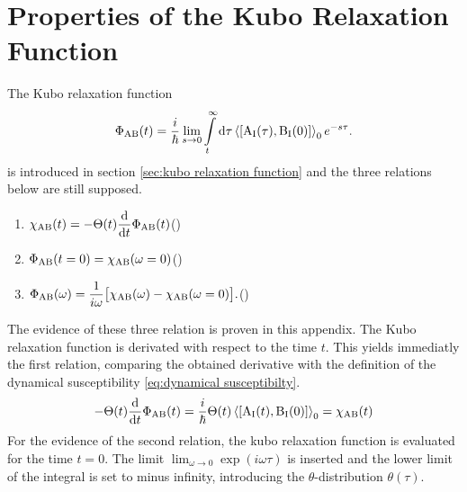 %
%
\chapter{Properties of the Kubo Relaxation Function}
\label{app:properties of the Kubo relaxation function}
%
%
The Kubo relaxation function 
%
\begin{align}
	\Phi_{\mt{AB}}(t) = \frac{i}{\hbar} \lim\limits_{s \to 0} \int\limits_{t}^{\infty} \dd{\tau} \expval{\comm{\mt{A}_{\mt{I}}(\tau)}{\mt{B}_{\mt{I}}(0)}}_{0} e^{-s\tau}.
	\label{appeq:Kubo relaxation function}
\end{align}
%
is introduced in section \ref{sec:kubo relaxation function} and the three relations below are still supposed.
%
\begin{enumerate}
	\item $\begin{aligned}[t] \chi_{\mathrm{AB}}(t) = -\Theta(t) \dv{t} \Phi_{\mathrm{AB}}(t) \end{aligned}$\hfill {}(\theequation)\label{appeq:relation 1 between Phi and chi}
	\item $\begin{aligned}[t] \Phi_{\mathrm{AB}}(t = 0) = \chi_{\mathrm{AB}}(\omega = 0) \end{aligned}$\hfill {}(\theequation)\label{appeq:relation 2 between Phi and chi}
	\item $\begin{aligned}[t] \Phi_{\mathrm{AB}}(\omega) = \frac{1}{i\omega}\big[\chi_{\mathrm{AB}}(\omega) - \chi_{\mathrm{AB}}(\omega = 0)\big]. \end{aligned}$\hfill {}(\theequation)\label{appeq:relation 3 between Phi and chi}
\end{enumerate}
%
The evidence of these three relation is proven in this appendix.
The Kubo relaxation function is derivated with respect to the time $t$.
This yields immediatly the first relation, comparing the obtained derivative with the definition of the dynamical susceptibility \eqref{eq:dynamical susceptibilty}.
%
\begin{align}
	-\Theta(t) \dv{t} \Phi_{\mt{AB}}(t) = \frac{i}{\hbar} \Theta(t) \expval{\comm{\mt{A}_{\mt{I}}(t)}{\mt{B}_{\mt{I}}(0)}}_{0} = \chi_{\mt{AB}}(t)
	\label{eq:proof relation 1}
\end{align}
%
For the evidence of the second relation, the kubo relaxation function is evaluated for the time $t=0$.
The limit $\lim_{\omega\to0} \exp(i\omega \tau)$ is inserted and the lower limit of the integral is set to minus infinity, introducing the $\theta$-distribution $\theta(\tau)$.
